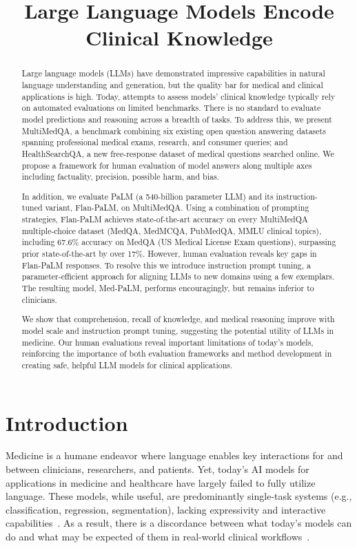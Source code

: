 \title{Large Language Models Encode Clinical Knowledge}

\begin{abstract}
Large language models (LLMs) have demonstrated impressive capabilities in natural language understanding and generation, but the quality bar for medical and clinical applications is high. Today, attempts to assess models’ clinical knowledge typically rely on automated evaluations on limited benchmarks. There is no standard to evaluate model predictions and reasoning across a breadth of tasks. To address this, we present MultiMedQA, a benchmark combining six existing open question answering datasets spanning professional medical exams, research, and consumer queries; and HealthSearchQA, a new free-response dataset of medical questions searched online. We propose a framework for human evaluation of model answers along multiple axes including factuality, precision, possible harm, and bias.

In addition, we evaluate PaLM (a 540-billion parameter LLM) and its instruction-tuned variant, Flan-PaLM, on MultiMedQA. Using a combination of prompting strategies, Flan-PaLM achieves state-of-the-art accuracy on every MultiMedQA multiple-choice dataset (MedQA, MedMCQA, PubMedQA, MMLU clinical topics), including 67.6\% accuracy on MedQA (US Medical License Exam questions), surpassing prior state-of-the-art by over 17\%. However, human evaluation reveals key gaps in Flan-PaLM responses. To resolve this we introduce instruction prompt tuning, a parameter-efficient approach for aligning LLMs to new domains using a few exemplars. The resulting model, Med-PaLM, performs encouragingly, but remains inferior to clinicians.

We show that comprehension, recall of knowledge, and medical reasoning improve with model scale and instruction prompt tuning, suggesting the potential utility of LLMs in medicine. Our human evaluations reveal important limitations of today’s models, reinforcing the importance of both evaluation frameworks and method development in creating safe, helpful LLM models for clinical applications.
\end{abstract}

\section{Introduction}
\label{sec:introduction}

Medicine is a humane endeavor where language enables key interactions for and between clinicians, researchers, and patients. Yet, today’s AI models for applications in medicine and healthcare have largely failed to fully utilize language. These models, while useful, are predominantly single-task systems (e.g., classification, regression, segmentation), lacking expressivity and interactive capabilities~\cite{esteva2021deep, tomavsev2021use, yim2020predicting}. As a result, there is a discordance between what today’s models can do and what may be expected of them in real-world clinical workflows~\cite{lakkaraju2022rethinking, schaekermann2020expert}.

